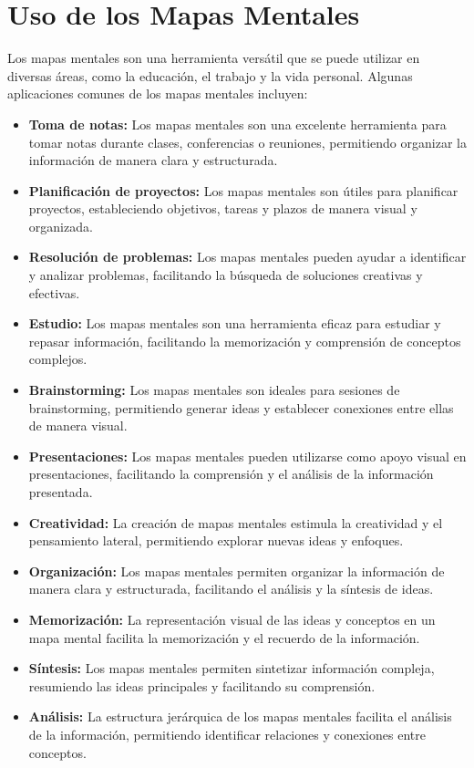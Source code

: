 \documentclass[12pt, a4paper, twoside]{article}
\begin{document}
 \section{Uso de los Mapas Mentales}
Los mapas mentales son una herramienta versátil que se puede utilizar en diversas áreas, como la educación, el trabajo y la vida personal. Algunas aplicaciones comunes de los mapas mentales incluyen:
\begin{itemize}
    \item \textbf{Toma de notas:} Los mapas mentales son una excelente herramienta para tomar notas durante clases, conferencias o reuniones, permitiendo organizar la información de manera clara y estructurada.
    \item \textbf{Planificación de proyectos:} Los mapas mentales son útiles para planificar proyectos, estableciendo objetivos, tareas y plazos de manera visual y organizada.
    \item \textbf{Resolución de problemas:} Los mapas mentales pueden ayudar a identificar y analizar problemas, facilitando la búsqueda de soluciones creativas y efectivas.
    \item \textbf{Estudio:} Los mapas mentales son una herramienta eficaz para estudiar y repasar información, facilitando la memorización y comprensión de conceptos complejos.
    \item \textbf{Brainstorming:} Los mapas mentales son ideales para sesiones de brainstorming, permitiendo generar ideas y establecer conexiones entre ellas de manera visual.
    \item \textbf{Presentaciones:} Los mapas mentales pueden utilizarse como apoyo visual en presentaciones, facilitando la comprensión y el análisis de la información presentada.
    \item \textbf{Creatividad:} La creación de mapas mentales estimula la creatividad y el pensamiento lateral, permitiendo explorar nuevas ideas y enfoques.
    \item \textbf{Organización:} Los mapas mentales permiten organizar la información de manera clara y estructurada, facilitando el análisis y la síntesis de ideas.
    \item \textbf{Memorización:} La representación visual de las ideas y conceptos en un mapa mental facilita la memorización y el recuerdo de la información.
    \item \textbf{Síntesis:} Los mapas mentales permiten sintetizar información compleja, resumiendo las ideas principales y facilitando su comprensión.
    \item \textbf{Análisis:} La estructura jerárquica de los mapas mentales facilita el análisis de la información, permitiendo identificar relaciones y conexiones entre conceptos.

\end{itemize}
\end{document}
